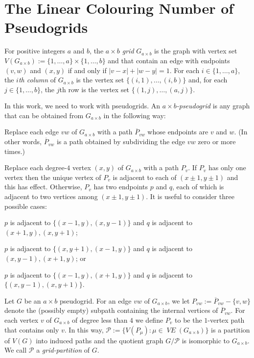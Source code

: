 \documentclass{patmorin}
\newcommand{\defin}[1]{\emph{\color{brown}#1}}
\DeclareMathOperator{\VE}{\mathit{VE}}
\begin{document}
\section{The Linear Colouring Number of Pseudogrids}

For positive integers $a$ and $b$, the \emph{$a\times b$ grid} $G_{a\times b}$ is the graph with vertex set $V(G_{a\times b}):=\{1,\ldots,a\}\times\{1,\ldots,b\}$ and that contain an edge with endpoints $(v,w)$ and $(x,y)$ if and only if $|v-x|+|w-y|=1$.  For each $i\in\{1,\ldots,a\}$, the \emph{$i$th column} of $G_{a\times b}$ is the vertex set $\{(i,1),\ldots,(i,b)\}$ and, for each $j\in\{1,\ldots,b\}$, the $j$th row is the vertex set $\{(1,j),\ldots,(a,j)\}$.

In this work, we need to work with pseudogrids.  An \defin{$a\times b$-pseudogrid} is any graph that can be obtained from $G_{a\times b}$ in the following way:
\begin{compactitem}
  \item Replace each edge $vw$ of $G_{a\times b}$ with a path $\overline{P}_{vw}$ whose endpoints are $v$ and $w$.  (In other words, $\overline{P}_{vw}$ is a path obtained by subdividing the edge $vw$ zero or more times.)
  \item Replace each degree-$4$ vertex $(x,y)$ of $G_{a\times b}$ with a path $P_v$. If $P_v$ has only one vertex then the unique vertex of $P_v$ is adjacent to each of $(x\pm 1,y\pm 1)$ and this has effect.  Otherwise, $P_v$ has two endpoints $p$ and $q$, each of which is adjacent to two vertices among $(x\pm 1,y\pm 1)$.  It is useful to consider three possible cases:
  \begin{compactenum}[(Q1)]
    \item \label{q_i} $p$ is adjacent to $\{(x-1,y), (x,y-1)\}$ and $q$ is adjacent to $(x+1,y),(x,y+1)$;
    \item \label{q_ii} $p$ is adjacent to $\{(x,y+1), (x-1,y)\}$ and $q$ is adjacent to $(x,y-1),(x+1,y)$; or
    \item \label{q_iii} $p$ is adjacent to $\{(x-1,y),(x+1,y)\}$ and $q$ is adjacent to $\{(x,y-1),(x,y+1)\}$.
  \end{compactenum}
\end{compactitem}

Let $G$ be an $a\times b$ pseudogrid.  For an edge $vw$ of $G_{a\times b}$, we let $P_{vw}:=\overline{P}_{vw}-\{v,w\}$ denote the (possibly empty) subpath containing the internal vertices of $\overline{P}_{vw}$.  For each vertex $v$ of $G_{a\times b}$ of degree less than $4$ we define $P_{v}$ to be the $1$-vertex path that contains only $v$.  In this way, $\mathcal{P}:=\{V(P_\mu):\mu\in \VE(G_{a\times b})\}$ is a partition of $V(G)$ into induced paths and the quotient graph $G/\mathcal{P}$ is isomorphic to $G_{a\times b}$.  We call $\mathcal{P}$ a \defin{grid-partition} of $G$.
\end{document}
